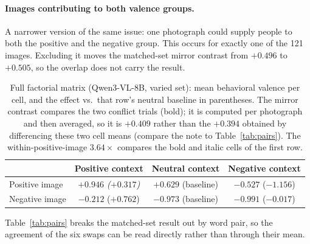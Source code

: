 \documentclass{article}
\newcommand{\qwen}{Qwen3-VL-8B}
\begin{document}
\paragraph{Images contributing to both valence groups.}
A narrower version of the same issue: one photograph could supply people to both the positive and the negative group. This occurs for exactly one of the 121 images. Excluding it moves the matched-set mirror contrast from $+0.496$ to $+0.505$, so the overlap does not carry the result.

\begin{table}[h]
  \caption{Full factorial matrix (\qwen{}, varied set): mean behavioral valence per cell, and the effect vs.\ that row's neutral baseline in parentheses. The mirror contrast compares the two conflict trials (bold); it is computed per photograph and then averaged, so it is $+0.409$ rather than the $+0.394$ obtained by differencing these two cell means (compare the note to Table~\ref{tab:pairs}). The within-positive-image $3.64\times$ compares the bold and italic cells of the first row.}
  \label{tab:factorial}
  \centering
  \begin{tabular}{lccc}
    \toprule
    & Positive context & Neutral context & Negative context \\
    \midrule
    Positive image & \emph{$+0.946$ ($+0.317$)} & $+0.629$ (baseline) & $\mathbf{-0.527}$ ($\mathbf{-1.156}$) \\
    Negative image & $\mathbf{-0.212}$ ($\mathbf{+0.762}$) & $-0.973$ (baseline) & $-0.991$ ($-0.017$) \\
    \bottomrule
  \end{tabular}
\end{table}

Table~\ref{tab:pairs} breaks the matched-set result out by word pair, so the agreement of the six swaps can be read directly rather than through their mean.
\end{document}
